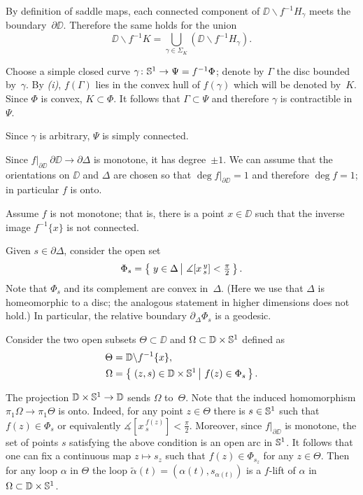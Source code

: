 \documentclass{article}
\begin{document}
By definition of saddle maps, each connected component of $\DD\backslash f^{-1}H_\gamma$ meets the boundary~$\partial\DD$.
Therefore the same holds for the union
\[\DD\backslash f^{-1}K=\bigcup_{\gamma\in\Sigma_K}(\DD\backslash f^{-1}H_\gamma).\]

Choose a simple closed curve $\gamma\colon\mathbb{S}^1\to\Psi=f^{-1}\Phi$;
denote by $\Gamma$ the disc bounded by~$\gamma$.
By \textit{(i)}, $f(\Gamma)$ lies in the convex hull of $f(\gamma)$ which will be denoted by~$K$.
Since $\Phi$ is convex, $K\subset \Phi$.
It follows that $\Gamma\subset\Psi$ and therefore $\gamma$ is contractible in~$\Psi$.

Since $\gamma$ is arbitrary, $\Psi$ is simply connected.
\qeds

Since $f|_{\partial\DD}\:\partial\DD \to\partial \Delta$ is monotone, it has degree~$\pm1$.
We can assume that the orientations on $\DD$ and $\Delta$ are chosen so that $\deg f|_{\partial\DD}=1$
and therefore $\deg f=1$;
in particular $f$ is onto.

Assume $f$ is not monotone;
that is, there is a point $x\in \DD$ such that the inverse image $f^{-1}\{x\}$ is not connected.

Given $s\in\partial \Delta$, consider the open set
\[\Phi_s=\set{y\in\Delta}{\measuredangle [x\,^y_s]<\tfrac\pi2}.\]
Note that $\Phi_s$ and its complement are convex in~$\Delta$.
(Here we use that $\Delta$ is homeomorphic to a disc; the analogous statement in higher dimensions does not hold.)
In particular, the relative boundary $\partial_\Delta\Phi_s$ is a geodesic.

Consider the two open subsets $\Theta\subset \DD$ and $\Omega\subset\mathbb{D}\times\mathbb{S}^1$ defined as
\begin{align*}
\Theta&=\DD\backslash f^{-1}\{x\},
\\
\Omega&=\set{(z,s)\in \DD\times\SS^1}{f(z)\in \Phi_s}.
\end{align*}

The projection $\mathbb{D}\times\mathbb{S}^1\to \mathbb{D}$ sends $\Omega$ to~$\Theta$.
Note that the induced homomorphism $\pi_1\Omega\to \pi_1\Theta$ is onto.
Indeed, for any point $z\in \Theta$ there is $s\in \mathbb{S}^1$ such that $f(z)\in \Phi_s$ or equivalently $\measuredangle [x\,^{f(z)}_s]<\tfrac\pi2$.
Moreover, since $f|_{\partial\DD}$ is monotone, the set of points $s$ satisfying the above condition is an open arc in $\mathbb{S}^1$.
It follows that one can fix a continuous map $z\mapsto s_z$ such that $f(z)\in \Phi_{s_z}$ for any $z\in \Theta$.
Then for any loop $\alpha$ in $\Theta$ the loop $\tilde\alpha(t)=(\alpha(t),s_{\alpha(t)})$ is a $f$-lift of $\alpha$ in $\Omega\subset\mathbb{D}\times\mathbb{S}^1$.
\end{document}
